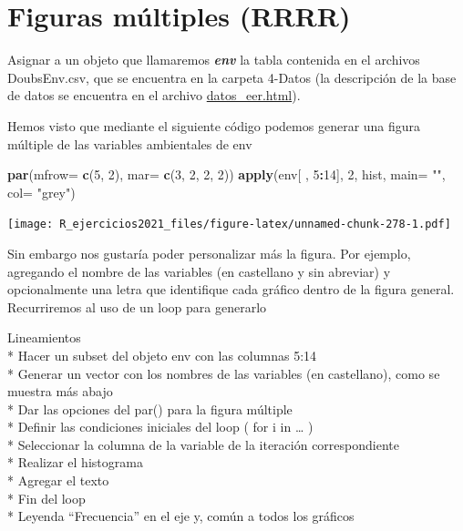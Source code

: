 \documentclass[]{book}
\newenvironment{Shaded}{\begin{snugshade}}{\end{snugshade}}
\newcommand{\DataTypeTok}[1]{\textcolor[rgb]{0.13,0.29,0.53}{#1}}
\newcommand{\DecValTok}[1]{\textcolor[rgb]{0.00,0.00,0.81}{#1}}
\newcommand{\KeywordTok}[1]{\textcolor[rgb]{0.13,0.29,0.53}{\textbf{#1}}}
\newcommand{\NormalTok}[1]{#1}
\newcommand{\OperatorTok}[1]{\textcolor[rgb]{0.81,0.36,0.00}{\textbf{#1}}}
\newcommand{\StringTok}[1]{\textcolor[rgb]{0.31,0.60,0.02}{#1}}
\begin{document}
\hypertarget{figuras-muxfaltiples-rrrr}{%
\section{Figuras múltiples (RRRR)}\label{figuras-muxfaltiples-rrrr}}

Asignar a un objeto que llamaremos \textbf{\emph{env}} la tabla contenida en el archivos DoubsEnv.csv, que se encuentra en la carpeta 4-Datos (la descripción de la base de datos se encuentra en el archivo \url{datos_eer.html}).

Hemos visto que mediante el siguiente código podemos generar una figura múltiple de las variables ambientales de env

\begin{Shaded}
\begin{Highlighting}[]
\KeywordTok{par}\NormalTok{(}\DataTypeTok{mfrow=} \KeywordTok{c}\NormalTok{(}\DecValTok{5}\NormalTok{, }\DecValTok{2}\NormalTok{), }\DataTypeTok{mar=} \KeywordTok{c}\NormalTok{(}\DecValTok{3}\NormalTok{, }\DecValTok{2}\NormalTok{, }\DecValTok{2}\NormalTok{, }\DecValTok{2}\NormalTok{))}
\KeywordTok{apply}\NormalTok{(env[ , }\DecValTok{5}\OperatorTok{:}\DecValTok{14}\NormalTok{], }\DecValTok{2}\NormalTok{, hist, }\DataTypeTok{main=} \StringTok{""}\NormalTok{, }\DataTypeTok{col=} \StringTok{"grey"}\NormalTok{)}
\end{Highlighting}
\end{Shaded}

\texttt{[image: R\_ejercicios2021\_files/figure-latex/unnamed-chunk-278-1.pdf]}

Sin embargo nos gustaría poder personalizar más la figura. Por ejemplo, agregando el nombre de las variables (en castellano y sin abreviar) y opcionalmente una letra que identifique cada gráfico dentro de la figura general. Recurriremos al uso de un loop para generarlo

Lineamientos\\
* Hacer un subset del objeto env con las columnas 5:14\\
* Generar un vector con los nombres de las variables (en castellano), como se muestra más abajo\\
* Dar las opciones del par() para la figura múltiple\\
* Definir las condiciones iniciales del loop ( for i in \ldots{} )\\
* Seleccionar la columna de la variable de la iteración correspondiente\\
* Realizar el histograma\\
* Agregar el texto\\
* Fin del loop\\
* Leyenda ``Frecuencia'' en el eje y, común a todos los gráficos
\end{document}
